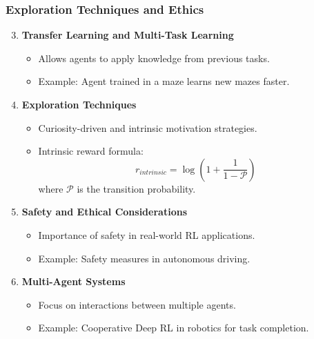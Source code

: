 \documentclass{beamer}
\begin{document}
\begin{frame}[fragile]
    \frametitle{Exploration Techniques and Ethics}
    \begin{enumerate}
        \setcounter{enumi}{2}
        \item \textbf{Transfer Learning and Multi-Task Learning}
            \begin{itemize}
                \item Allows agents to apply knowledge from previous tasks.
                \item Example: Agent trained in a maze learns new mazes faster.
            \end{itemize}
        
        \item \textbf{Exploration Techniques}
            \begin{itemize}
                \item Curiosity-driven and intrinsic motivation strategies.
                \item Intrinsic reward formula:
                \begin{equation}
                    r_{intrinsic} = \log(1 + \frac{1}{1-\mathcal{P}})
                \end{equation}
                where $\mathcal{P}$ is the transition probability.
            \end{itemize}
        
        \item \textbf{Safety and Ethical Considerations}
            \begin{itemize}
                \item Importance of safety in real-world RL applications.
                \item Example: Safety measures in autonomous driving.
            \end{itemize}
        
        \item \textbf{Multi-Agent Systems}
            \begin{itemize}
                \item Focus on interactions between multiple agents.
                \item Example: Cooperative Deep RL in robotics for task completion.
            \end{itemize}
    \end{enumerate}
\end{frame}
\end{document}
